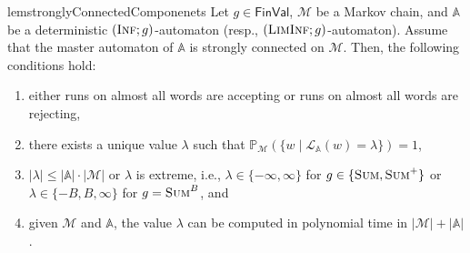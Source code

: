 \documentclass{lmcs}
\newcommand{\nestedA}{\mathbb{A}}
\newcommand{\valueL}[1]{\mathcal{L}_{{#1}}}
\newcommand{\fsum}{\textsc{Sum}}
\newcommand{\fBsum}[1]{\textsc{Sum}^{#1}}
\newcommand{\fliminf}{\textsc{LimInf}}
\newcommand{\finf}{\textsc{Inf}}
\newcommand{\FinVal}{\mathsf{FinVal}}
\newcommand{\probability}{\mathbb{P}}
\newcommand{\markov}{\mathcal{M}}
\begin{document}
\begin{restatable}{lem}{stronglyConnectedComponenets}\label{l:in-scc-all-equal}
Let $g \in \FinVal$, $\markov$ be a Markov chain, and
$\nestedA$ be a deterministic $(\finf;g)$-automaton (resp., $(\fliminf; g)$-automaton).
Assume that the master automaton of $\nestedA$ is strongly connected on $\markov$.
Then, the following conditions hold:
\begin{enumerate}
\item either runs on almost all words are accepting or runs on almost all words are rejecting,
\item there exists a unique value $\lambda$ such that $\probability_{\markov}(\{ w \mid \valueL{\nestedA}(w) = \lambda \}) = 1$,
\item $|\lambda| \leq |\nestedA|\cdot |\markov|$ or $\lambda$ is extreme, i.e.,  $\lambda \in \{-\infty,\infty\}$ for $g \in \{\fsum,\fsum^+\}$ or $\lambda  \in \{ -B, B,\infty\}$ for $g = \fBsum{B}$, and
\item given $\markov$ and $\nestedA$, the value $\lambda$ can be computed in polynomial time in $|\markov| + |\nestedA|$.
\end{enumerate}
\end{restatable}
\end{document}
